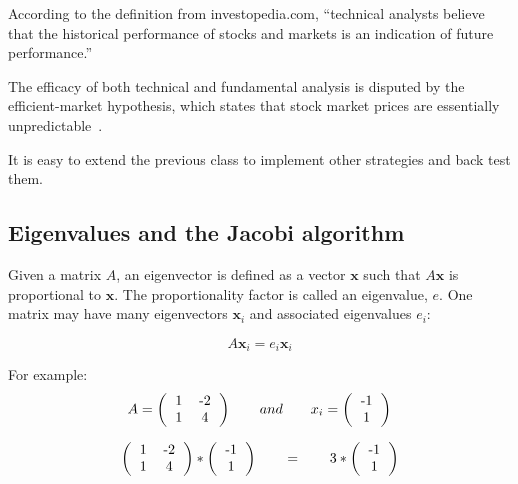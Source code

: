\documentclass[justified, sixbynine]{tufte-book}
\theoremstyle{plain}%
\newtheorem * {corollary}{Corollary}
\theoremstyle{definition}
\theoremstyle{remark}
\newtheorem * {remark}{Remark}
\newtheorem * {note}{Note}
\begin{document}
\begin{fullwidth}
According to the definition from investopedia.com, ``technical analysts believe that the historical performance of stocks and markets is an indication of future performance.''

The efficacy of both technical and fundamental analysis is disputed by the efficient-market hypothesis, which states that stock market prices are essentially unpredictable~\cite{andrew}.

It is easy to extend the previous class to implement other strategies and back test them.

\goodbreak\subsection{Eigenvalues and the Jacobi algorithm}


Given a matrix $A$, an eigenvector is defined as a vector $\mathbf{x}$ such that
$A\mathbf{x}$ is proportional to $\mathbf{x}$.
The proportionality factor is called an eigenvalue, $e$. One matrix may have many eigenvectors $\mathbf{x}_i$ and associated eigenvalues $e_i$:

\begin{equation}
A\mathbf{x}_i = e_i\mathbf{x}_i
\end{equation}

For example:
\begin{equation}
A = \left(\begin{tabular}{ccc}
1 & -2  \\
1 & 4  \\
\end{tabular}\right) \qquad and \qquad
x_i =
\left(\begin{tabular}{c}
-1 \\
1 \\
\end{tabular}\right)
\end{equation}

\begin{equation}
\left(\begin{tabular}{ccc}
1 & -2  \\
1 & 4  \\
\end{tabular}\right) *
\left(\begin{tabular}{c}
-1 \\
1 \\
\end{tabular}\right) \qquad =  \qquad
3 * \left(\begin{tabular}{c}
-1 \\
1 \\
\end{tabular}\right)
\end{equation}


\end{fullwidth}
\end{document}
